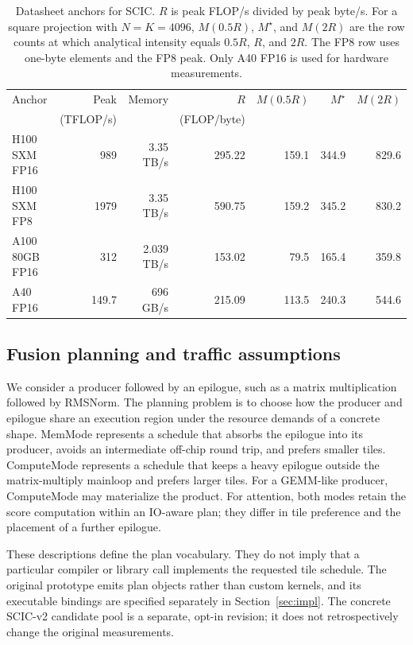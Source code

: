 \documentclass[a4paper,fleqn]{cas-dc}
\begin{document}
\begin{table}[t]
  \centering
  \caption{Datasheet anchors for SCIC.
$R$ is peak FLOP/s divided by peak byte/s.
For a square projection with $N{=}K{=}4096$, $M(0.5R)$, $M^{\star}$, and $M(2R)$ are the row counts at which analytical intensity equals $0.5R$, $R$, and $2R$.
The FP8 row uses one-byte elements and the FP8 peak.
Only A40 FP16 is used for hardware measurements.}
  \label{tab:ridges}
  \footnotesize
  \setlength{\tabcolsep}{1pt}
  \begin{tabular}{@{}lrrrrrr@{}}
    \toprule
    Anchor & Peak & Memory & $R$ & $M(0.5R)$ & $M^{\star}$ & $M(2R)$ \\
           & (TFLOP/s) & & (FLOP/byte) & & & \\
    \midrule
    H100 SXM FP16 & 989 & 3.35 TB/s & 295.22 & 159.1 & 344.9 & 829.6 \\
    H100 SXM FP8  & 1979 & 3.35 TB/s & 590.75 & 159.2 & 345.2 & 830.2 \\
    A100 80GB FP16 & 312 & 2.039 TB/s & 153.02 & 79.5 & 165.4 & 359.8 \\
    A40 FP16 & 149.7 & 696 GB/s & 215.09 & 113.5 & 240.3 & 544.6 \\
    \bottomrule
  \end{tabular}
\end{table}

\subsection{Fusion planning and traffic assumptions}
\label{sec:modes}

We consider a producer followed by an epilogue, such as a matrix multiplication followed by RMSNorm.
The planning problem is to choose how the producer and epilogue share an execution region under the resource demands of a concrete shape.
MemMode represents a schedule that absorbs the epilogue into its producer, avoids an intermediate off-chip round trip, and prefers smaller tiles.
ComputeMode represents a schedule that keeps a heavy epilogue outside the matrix-multiply mainloop and prefers larger tiles.
For a GEMM-like producer, ComputeMode may materialize the product.
For attention, both modes retain the score computation within an IO-aware plan; they differ in tile preference and the placement of a further epilogue.

These descriptions define the plan vocabulary.
They do not imply that a particular compiler or library call implements the requested tile schedule.
The original prototype emits plan objects rather than custom kernels, and its executable bindings are specified separately in Section~\ref{sec:impl}. The concrete SCIC-v2 candidate pool is a separate, opt-in revision; it does not retrospectively change the original measurements.
\end{document}
